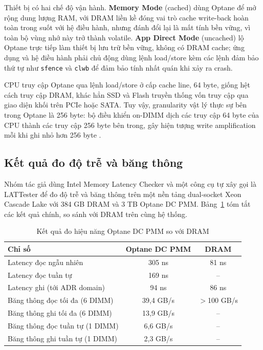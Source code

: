 \documentclass[12pt,a4paper]{article}
\begin{document}
Thiết bị có hai chế độ vận hành. \textbf{Memory Mode} (cached) dùng Optane để mở rộng dung lượng RAM, với DRAM liền kề đóng vai trò cache write-back hoàn toàn trong suốt với hệ điều hành, nhưng đánh đổi lại là mất tính bền vững, vì toàn bộ vùng nhớ này trở thành volatile. \textbf{App Direct Mode} (uncached) lộ Optane trực tiếp làm thiết bị lưu trữ bền vững, không có DRAM cache; ứng dụng và hệ điều hành phải chủ động dùng lệnh load/store kèm các lệnh đảm bảo thứ tự như \texttt{sfence} và \texttt{clwb} để đảm bảo tính nhất quán khi xảy ra crash.

CPU truy cập Optane qua lệnh load/store ở cấp cache line, 64 byte, giống hệt cách truy cập DRAM, khác hẳn SSD và Flash truyền thống vốn truy cập qua giao diện khối trên PCIe hoặc SATA. Tuy vậy, granularity vật lý thực sự bên trong Optane là 256 byte: bộ điều khiển on-DIMM dịch các truy cập 64 byte của CPU thành các truy cập 256 byte bên trong, gây hiện tượng write amplification mỗi khi ghi nhỏ hơn 256 byte \cite{izraelevitz2019}.

\subsection{Kết quả đo độ trễ và băng thông}

Nhóm tác giả dùng Intel Memory Latency Checker và một công cụ tự xây gọi là LATTester để đo độ trễ và băng thông trên một nền tảng dual-socket Xeon Cascade Lake với 384 GB DRAM và 3 TB Optane DC PMM. Bảng~\ref{tab:optane-results} tóm tắt các kết quả chính, so sánh với DRAM trên cùng hệ thống.

\begin{table}[h]
\centering
\caption{Kết quả đo hiệu năng Optane DC PMM so với DRAM \cite{izraelevitz2019}}
\label{tab:optane-results}
\begin{tabular}{lcc}
\toprule
\textbf{Chỉ số} & \textbf{Optane DC PMM} & \textbf{DRAM} \\
\midrule
Latency đọc ngẫu nhiên & 305 ns & 81 ns \\
Latency đọc tuần tự & 169 ns & -- \\
Latency ghi (tới ADR domain) & 94 ns & 86 ns \\
Băng thông đọc tối đa (6 DIMM) & 39,4 GB/s & $>$100 GB/s \\
Băng thông ghi tối đa (6 DIMM) & 13,9 GB/s & -- \\
Băng thông đọc tuần tự (1 DIMM) & 6,6 GB/s & -- \\
Băng thông ghi tuần tự (1 DIMM) & 2,3 GB/s & -- \\
\bottomrule
\end{tabular}
\end{table}
\end{document}
